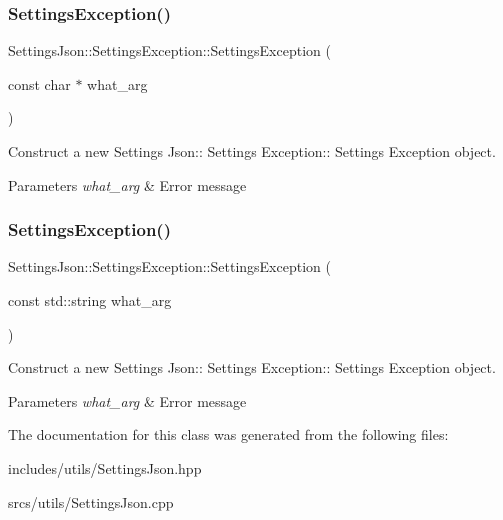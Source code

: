 \subsubsection{\texorpdfstring{Settings\+Exception()}{SettingsException()}\hspace{0.1cm}{\footnotesize\ttfamily [1/2]}}
{\footnotesize\ttfamily Settings\+Json\+::\+Settings\+Exception\+::\+Settings\+Exception (\begin{DoxyParamCaption}\item[{const char $\ast$}]{what\+\_\+arg }\end{DoxyParamCaption})\hspace{0.3cm}{\ttfamily [explicit]}}



Construct a new Settings Json\+:\+: Settings Exception\+:\+: Settings Exception object. 


\begin{DoxyParams}{Parameters}
{\em what\+\_\+arg} & Error message \\
\hline
\end{DoxyParams}
\mbox{\label{class_settings_json_1_1_settings_exception_a085dab75cbd99e45934c8ba53074a33f}} 
\subsubsection{\texorpdfstring{Settings\+Exception()}{SettingsException()}\hspace{0.1cm}{\footnotesize\ttfamily [2/2]}}
{\footnotesize\ttfamily Settings\+Json\+::\+Settings\+Exception\+::\+Settings\+Exception (\begin{DoxyParamCaption}\item[{const std\+::string}]{what\+\_\+arg }\end{DoxyParamCaption})\hspace{0.3cm}{\ttfamily [explicit]}}



Construct a new Settings Json\+:\+: Settings Exception\+:\+: Settings Exception object. 


\begin{DoxyParams}{Parameters}
{\em what\+\_\+arg} & Error message \\
\hline
\end{DoxyParams}


The documentation for this class was generated from the following files\+:\begin{DoxyCompactItemize}
\item 
includes/utils/Settings\+Json.\+hpp\item 
srcs/utils/Settings\+Json.\+cpp\end{DoxyCompactItemize}
